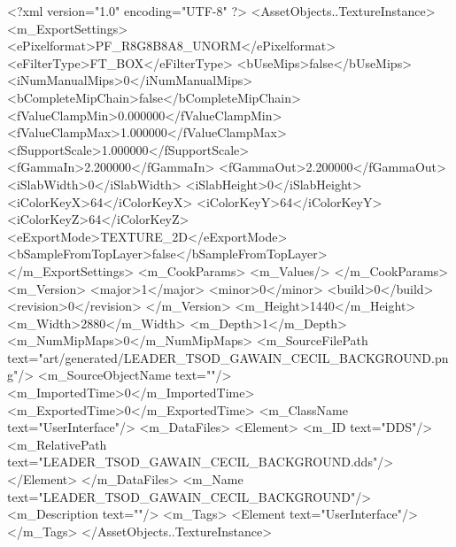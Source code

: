<?xml version="1.0" encoding="UTF-8" ?>
<AssetObjects..TextureInstance>
	<m_ExportSettings>
		<ePixelformat>PF_R8G8B8A8_UNORM</ePixelformat>
		<eFilterType>FT_BOX</eFilterType>
		<bUseMips>false</bUseMips>
		<iNumManualMips>0</iNumManualMips>
		<bCompleteMipChain>false</bCompleteMipChain>
		<fValueClampMin>0.000000</fValueClampMin>
		<fValueClampMax>1.000000</fValueClampMax>
		<fSupportScale>1.000000</fSupportScale>
		<fGammaIn>2.200000</fGammaIn>
		<fGammaOut>2.200000</fGammaOut>
		<iSlabWidth>0</iSlabWidth>
		<iSlabHeight>0</iSlabHeight>
		<iColorKeyX>64</iColorKeyX>
		<iColorKeyY>64</iColorKeyY>
		<iColorKeyZ>64</iColorKeyZ>
		<eExportMode>TEXTURE_2D</eExportMode>
		<bSampleFromTopLayer>false</bSampleFromTopLayer>
	</m_ExportSettings>
	<m_CookParams>
		<m_Values/>
	</m_CookParams>
	<m_Version>
		<major>1</major>
		<minor>0</minor>
		<build>0</build>
		<revision>0</revision>
	</m_Version>
	<m_Height>1440</m_Height>
	<m_Width>2880</m_Width>
	<m_Depth>1</m_Depth>
	<m_NumMipMaps>0</m_NumMipMaps>
	<m_SourceFilePath text="art/generated/LEADER_TSOD_GAWAIN_CECIL_BACKGROUND.png"/>
	<m_SourceObjectName text=""/>
	<m_ImportedTime>0</m_ImportedTime>
	<m_ExportedTime>0</m_ExportedTime>
	<m_ClassName text="UserInterface"/>
	<m_DataFiles>
		<Element>
			<m_ID text="DDS"/>
			<m_RelativePath text="LEADER_TSOD_GAWAIN_CECIL_BACKGROUND.dds"/>
		</Element>
	</m_DataFiles>
	<m_Name text="LEADER_TSOD_GAWAIN_CECIL_BACKGROUND"/>
	<m_Description text=""/>
	<m_Tags>
		<Element text="UserInterface"/>
	</m_Tags>
</AssetObjects..TextureInstance>
